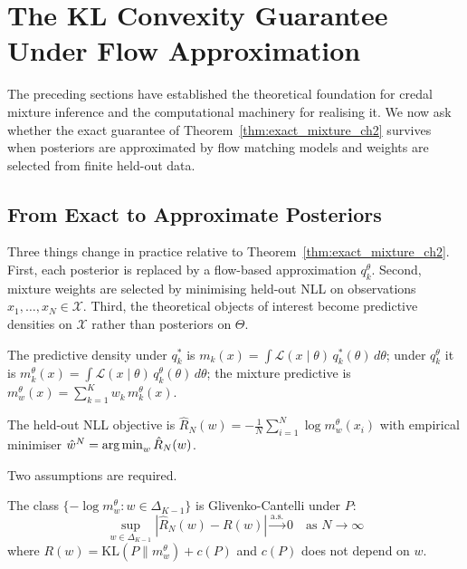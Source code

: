 \section{The KL Convexity Guarantee Under Flow Approximation}
The preceding sections have established the theoretical foundation for credal mixture inference and the computational machinery for realising it. We now ask whether the exact guarantee of Theorem~\ref{thm:exact_mixture_ch2} survives when posteriors are approximated by flow matching models and weights are selected from finite held-out data.

    \subsection{From Exact to Approximate Posteriors}

    Three things change in practice relative to Theorem~\ref{thm:exact_mixture_ch2}. First, each posterior is replaced by a flow-based approximation $q^\theta_k$. Second, mixture weights are selected by minimising held-out NLL on observations $x_1, \ldots, x_N \in \mathcal{X}$. Third, the theoretical objects of interest become predictive densities on $\mathcal{X}$ rather than posteriors on $\Theta$.

    \begin{definition}
    \label{def:priors_posteriors_predictive}
    The predictive density under $q^*_k$ is $m_k(x) = \int \mathcal{L}(x \mid \theta)\, q^*_k(\theta)\, d\theta$; under $q^\theta_k$ it is $m^\theta_k(x) = \int \mathcal{L}(x \mid \theta)\, q^\theta_k(\theta)\, d\theta$; the mixture predictive is $m^\theta_w(x) = \sum_{k=1}^K w_k\, m^\theta_k(x)$.
    \end{definition}

    The held-out NLL objective is $\hat{R}_N(w) = -\frac{1}{N} \sum_{i=1}^N \log m^\theta_w(x_i)$ with empirical minimiser $\hat{w}^N = \operatorname*{arg\,min}_{w} \hat{R}_N(w)$.

    Two assumptions are required.

    \begin{assumption}
    \label{ass:gc_ch2}
    The class $\{-\log m^\theta_w : w \in \Delta_{K-1}\}$ is Glivenko-Cantelli under $P$:
    \begin{equation}
        \sup_{w \in \Delta_{K-1}} \left| \hat{R}_N(w) - R(w) \right| \xrightarrow{\mathrm{a.s.}} 0 \quad \text{as } N \to \infty
    \end{equation}
    where $R(w) = \mathrm{KL}(P \| m^\theta_w) + c(P)$ and $c(P)$ does not depend on $w$.
    \end{assumption}


